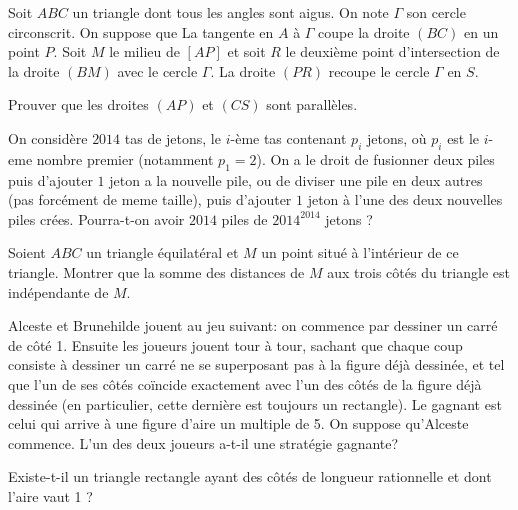\begin{exo}{} Soit $ABC$ un triangle dont tous les angles sont aigus. On note $ \Gamma$ son cercle circonscrit. On suppose que La tangente en $A$ à $\Gamma$ coupe la droite $(BC)$ en un point $P$. Soit $M$ le milieu de $[AP]$ et soit $R$ le deuxième point d'intersection de la droite $(BM)$ avec le cercle $ \Gamma$. La droite $(PR)$ recoupe le cercle $ \Gamma$ en $S$.

Prouver que les droites $(AP)$ et $(CS)$ sont parallèles.
\end{exo}


\begin{exo}{} 
On considère $2014$ tas de jetons, le $i$-ème tas contenant $p_{i}$ jetons, où $p_{i}$ est le
$i$-eme nombre premier (notamment $p_{1} = 2$). On a le droit de fusionner deux
piles puis d’ajouter $1$ jeton a la nouvelle pile, ou de diviser une pile en deux
autres (pas forcément de meme taille), puis d’ajouter $1$ jeton à l’une des deux
nouvelles piles crées. Pourra-t-on avoir $2014$ piles de $2014^{2014}$ jetons ?
\end{exo}

\begin{exo}{}Soient $ABC$ un triangle équilatéral et $M$ un point situé à l’intérieur de ce triangle. Montrer que la
somme des distances de $M$ aux trois côtés du triangle est indépendante de $M$.
\end{exo}


\begin{exo}{} 
Alceste et Brunehilde jouent au jeu suivant: on commence par dessiner un carré de côté 1. Ensuite les joueurs jouent tour à tour, sachant que chaque coup consiste à dessiner un carré ne se superposant pas à la figure déjà dessinée, et tel que l'un de ses côtés coïncide exactement avec l'un des côtés de la figure déjà dessinée (en particulier, cette dernière est toujours un rectangle). Le gagnant est celui qui arrive à une figure d'aire un multiple de 5. On suppose qu'Alceste commence. L'un des deux joueurs a-t-il une stratégie gagnante? 
\end{exo}




\begin{exo}{}Existe-t-il un triangle rectangle ayant des côtés de longueur rationnelle et dont l'aire vaut 1 ?
\end{exo}

